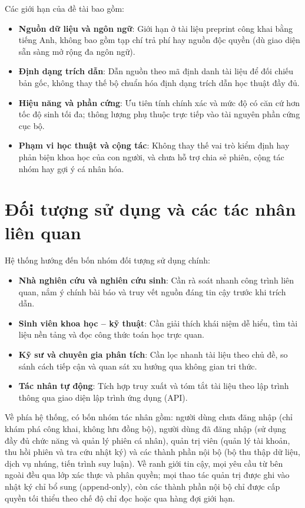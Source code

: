 Các giới hạn của đề tài bao gồm:

\begin{itemize}
  \item[--] \textbf{Nguồn dữ liệu và ngôn ngữ}: Giới hạn ở tài liệu preprint công khai bằng tiếng Anh, không bao gồm tạp chí trả phí hay nguồn độc quyền (dù giao diện sẵn sàng mở rộng đa ngôn ngữ).
  \item[--] \textbf{Định dạng trích dẫn}: Dẫn nguồn theo mã định danh tài liệu để đối chiếu bản gốc, không thay thế bộ chuẩn hóa định dạng trích dẫn học thuật đầy đủ.
  \item[--] \textbf{Hiệu năng và phần cứng}: Ưu tiên tính chính xác và mức độ có căn cứ hơn tốc độ sinh tối đa; thông lượng phụ thuộc trực tiếp vào tài nguyên phần cứng cục bộ.
  \item[--] \textbf{Phạm vi học thuật và cộng tác}: Không thay thế vai trò kiểm định hay phản biện khoa học của con người, và chưa hỗ trợ chia sẻ phiên, cộng tác nhóm hay gợi ý cá nhân hóa.
\end{itemize}

\section{Đối tượng sử dụng và các tác nhân liên quan}
\label{sec:doi-tuong-tac-nhan}

Hệ thống hướng đến bốn nhóm đối tượng sử dụng chính:

\begin{itemize}
  \item[--] \textbf{Nhà nghiên cứu và nghiên cứu sinh}: Cần rà soát nhanh công trình liên quan, nắm ý chính bài báo và truy vết nguồn đáng tin cậy trước khi trích dẫn.
  \item[--] \textbf{Sinh viên khoa học -- kỹ thuật}: Cần giải thích khái niệm dễ hiểu, tìm tài liệu nền tảng và đọc công thức toán học trực quan.
  \item[--] \textbf{Kỹ sư và chuyên gia phân tích}: Cần lọc nhanh tài liệu theo chủ đề, so sánh cách tiếp cận và quan sát xu hướng qua không gian tri thức.
  \item[--] \textbf{Tác nhân tự động}: Tích hợp truy xuất và tóm tắt tài liệu theo lập trình thông qua giao diện lập trình ứng dụng (API).
\end{itemize}

Về phía hệ thống, có bốn nhóm tác nhân gồm: người dùng chưa đăng nhập (chỉ khám phá công khai, không lưu đồng bộ), người dùng đã đăng nhập (sử dụng đầy đủ chức năng và quản lý phiên cá nhân), quản trị viên (quản lý tài khoản, thu hồi phiên và tra cứu nhật ký) và các thành phần nội bộ (bộ thu thập dữ liệu, dịch vụ nhúng, tiến trình suy luận). Về ranh giới tin cậy, mọi yêu cầu từ bên ngoài đều qua lớp xác thực và phân quyền; mọi thao tác quản trị được ghi vào nhật ký chỉ bổ sung (append-only), còn các thành phần nội bộ chỉ được cấp quyền tối thiểu theo chế độ chỉ đọc hoặc qua hàng đợi giới hạn.



